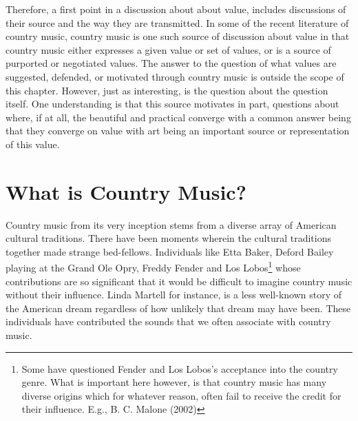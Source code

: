 \documentclass[12pt]{book}
\theoremstyle{definition}
\theoremstyle{remark}
\begin{document}
Therefore, a first point in a discussion about about value, includes discussions of their source and the way they are transmitted. In some of the recent literature of country music, country music is one such source of discussion about value in that country music either expresses a given value or set of values, or is a source of purported or negotiated values. The answer to the question of what values are suggested, defended, or motivated through country music is outside the scope of this chapter. However, just as interesting, is the question about the question itself. One understanding is that this source motivates in part, questions about where, if at all, the beautiful and practical converge with a common answer being that they converge on value with art being an important source or representation of this value.

\section{What is Country Music?}\label{what-is-country-music}

Country music from its very inception stems from a diverse array of American cultural traditions. There have been moments wherein the cultural traditions together made strange bed-fellows. Individuals like Etta Baker, Deford Bailey playing at the Grand Ole Opry, Freddy Fender and Los Lobos\footnote{Some have questioned Fender and Los Lobos's acceptance into the country genre. What is important here however, is that country music has many diverse origins which for whatever reason, often fail to receive the credit for their influence. E.g., B. C. Malone (2002)} whose contributions are so significant that it would be difficult to imagine country music without their influence. Linda Martell for instance, is a less well-known story of the American dream regardless of how unlikely that dream may have been. These individuals have contributed the sounds that we often associate with country music.
\end{document}
